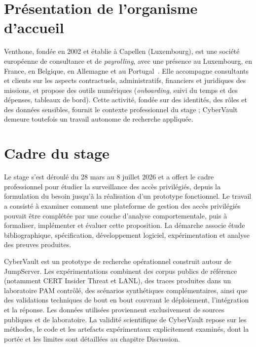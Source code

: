 \documentclass[11pt,a4paper,oneside]{report}
\theoremstyle{definition}
\theoremstyle{plain}
\begin{document}
\section{Présentation de l'organisme d'accueil}
\label{sec:intro-venthone}

Venthone, fondée en 2002 et établie à Capellen (Luxembourg), est une société
européenne de consultance et de \emph{payrolling}, avec une présence au
Luxembourg, en France, en Belgique, en Allemagne et au
Portugal~\cite{paperjam2026venthone,venthone2026about,venthone2026home}. Elle
accompagne consultants et clients sur les aspects contractuels, administratifs,
financiers et juridiques des missions, et propose des outils numériques
(\emph{onboarding}, suivi du temps et des dépenses, tableaux de bord). Cette
activité, fondée sur des identités, des rôles et des données sensibles,
fournit le contexte professionnel du stage ; CyberVault demeure toutefois un
travail autonome de recherche appliquée.

\section{Cadre du stage}
\label{sec:intro-stage}

Le stage s'est déroulé du 28 mars au 8 juillet 2026 et a offert le cadre
professionnel pour étudier la surveillance des accès privilégiés,
depuis la formulation du besoin jusqu'à la réalisation d'un prototype fonctionnel.
Le travail a consisté à examiner comment une plateforme de gestion
des accès privilégiés pouvait être complétée par une couche d'analyse
comportementale, puis à formaliser, implémenter et évaluer cette proposition.
La démarche associe étude
bibliographique, spécification, développement logiciel, expérimentation et
analyse des preuves produites.

CyberVault est un prototype de recherche opérationnel construit autour de JumpServer. Les
expérimentations combinent des corpus publics de référence (notamment CERT
Insider Threat et LANL), des traces produites dans un laboratoire PAM
contrôlé, des scénarios synthétiques complémentaires, ainsi que des
validations techniques de bout en bout couvrant le déploiement, l'intégration et la réponse.
Les données utilisées proviennent exclusivement de sources publiques et de
laboratoire. La
validité scientifique de CyberVault repose sur les méthodes, le code
et les artefacts expérimentaux explicitement examinés, dont la portée et les limites sont détaillées au chapitre Discussion.
\end{document}
